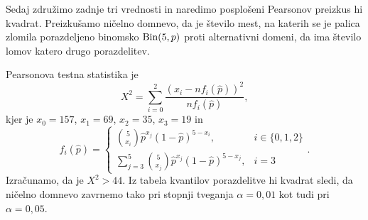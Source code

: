 \documentclass[12pt, a4paper]{article}
\begin{document}
Sedaj združimo zadnje tri vrednosti in naredimo posplošeni 
Pearsonov preizkus hi kvadrat. Preizkušamo ničelno domnevo, da 
je število mest, na katerih se je palica zlomila porazdeljeno 
binomsko $\operatorname{Bin}(5, p)$ proti alternativni domeni, da ima število 
lomov katero drugo porazdelitev.

Pearsonova testna statistika je
\[
    X^2 = \sum_{i=0}^{2}\frac{(x_i - nf_i(\hat p))^2}{nf_i(\hat p)},
\]
kjer je $x_0 = 157$, $x_1 = 69$, $x_2 = 35$, $x_3 = 19$ in
\[
    f_i(\hat p) = \begin{cases}
        \binom{5}{x_i}\hat p^{x_j}(1-\hat p)^{5-x_i}, &i \in \{0,1,2\} \\
        \sum_{j=3}^{5} \binom{5}{x_j}\hat p^{x_j}(1-\hat p)^{5-x_j}, &i = 3 
    \end{cases}.
\]
Izračunamo, da je $X^2 > 44$. Iz tabela kvantilov porazdelitve 
hi kvadrat sledi, da ničelno domnevo zavrnemo tako 
pri stopnji tveganja $\alpha = 0{,}01$ kot tudi pri $\alpha = 0{,}05$. 

\end{document}
